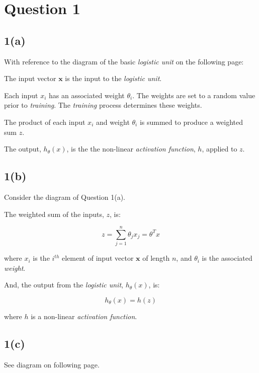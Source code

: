 \documentclass[12pt, a4paper,reqno]{article}
\begin{document}



%
%
\section*{Question 1}

\subsection*{1(a)}
With reference to the diagram of the basic \emph{logistic unit} on the following page:

The input vector $\mathbf{x}$ is the input to the \emph{logistic unit}.

Each input ${x}_i$ has an associated weight $\theta_i$. The weights are set to a random value prior to \emph{training}. The \emph{training} process determines these weights.

The product of each input $x_i$ and weight $\theta_i$ is summed to produce a weighted sum $z$.

The output, $h_\theta(x)$, is the the non-linear \emph{activation function}, $h$, applied to $z$.

\subsection*{1(b)}

Consider the diagram of Question 1(a).

The weighted sum of the inputs, $z$, is:

\begin{equation}
z = \sum_{j=1}^{n}\theta_j x_j = \theta^T x
\end{equation}

where $x_i$ is the $i^{th}$ element of input vector $\mathbf{x}$ of length $n$, and $\theta_i$ is the associated \emph{weight}. 

And, the output from the \emph{logistic unit}, $h_\theta(x)$, is:

\begin{equation}
h_\theta(x) = h(z)
\end{equation}

where $h$ is a non-linear \emph{activation function}.



\subsection*{1(c)}
See diagram on following page.
\end{document}
